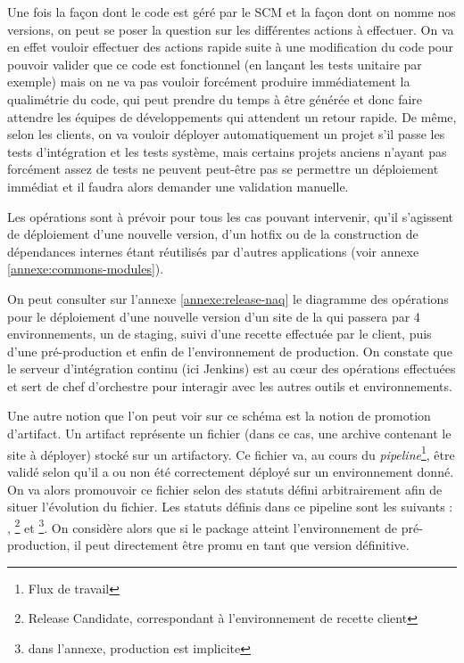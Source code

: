 Une fois la façon dont le code est géré par le \gls{SCM} et la façon dont on nomme nos versions, on peut se poser la question sur les différentes actions à effectuer. On va en effet vouloir effectuer des actions rapide suite à une modification du code pour pouvoir valider que ce code est fonctionnel (en lançant les tests unitaire par exemple) mais on ne va pas vouloir forcément produire immédiatement la qualimétrie du code, qui peut prendre du temps à être générée et donc faire attendre les équipes de développements qui attendent un retour rapide. De même, selon les clients, on va vouloir déployer automatiquement un projet s'il passe les tests d'intégration et les tests système, mais certains projets anciens n'ayant pas forcément assez de tests ne peuvent peut-être pas se permettre un déploiement immédiat et il faudra alors demander une validation manuelle.

Les opérations sont à prévoir pour tous les cas pouvant intervenir, qu'il s'agissent de déploiement d'une nouvelle version, d'un \gls{hotfix} ou de la construction de dépendances internes étant réutilisés par d'autres applications (voir annexe \ref{annexe:commons-modules}).

On peut consulter sur l'annexe \ref{annexe:release-naq} le diagramme des opérations pour le déploiement d'une nouvelle version d'un site de la \naq{} qui passera par 4 environnements, un de staging, suivi d'une recette effectuée par le client, puis d'une pré-production et enfin de l'environnement de production. On constate que le serveur d'intégration continu (ici Jenkins) est au cœur des opérations effectuées et sert de chef d'orchestre pour interagir avec les autres outils et environnements. 

Une autre notion que l'on peut voir sur ce schéma est la notion de promotion d'artifact. Un artifact représente un fichier (dans ce cas, une archive contenant le site à déployer) stocké sur un \gls{artifactory}. Ce fichier va, au cours du \emph{pipeline}\footnote{Flux de travail}, être validé selon qu'il a ou non été correctement déployé sur un environnement donné. On va alors promouvoir ce fichier selon des statuts défini arbitrairement afin de situer l'évolution du fichier. Les statuts définis dans ce pipeline sont les suivants : , \footnote{Release Candidate, correspondant à l'environnement de recette client} et \footnote{dans l'annexe, production est implicite}. On considère alors que si le package atteint l'environnement de pré-production, il peut directement être promu en tant que version définitive.

